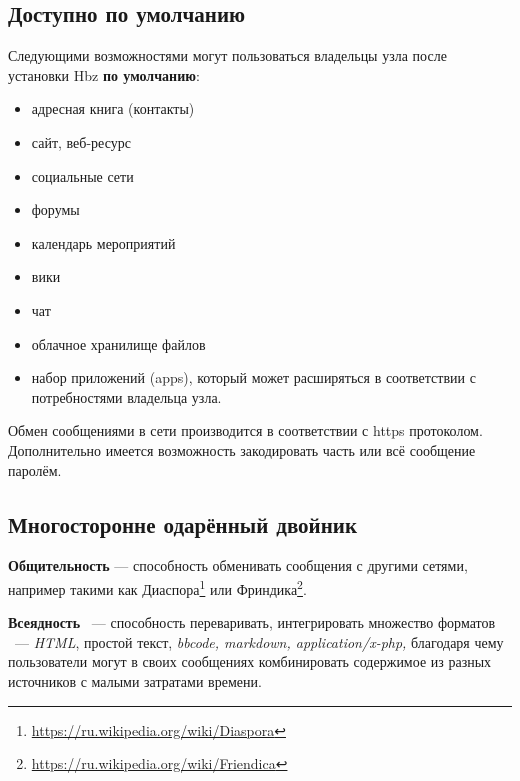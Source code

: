 \documentclass[10pt, a5paper]{article}
\begin{document}
\subsection*{Доступно по умолчанию}

Следующими возможностями могут пользоваться владельцы узла после установки Hbz \textbf{по умолчанию}:

\begin{itemize}
  \item адресная книга (контакты)
  \item сайт, веб-ресурс
  \item социальные сети
  \item форумы
  \item календарь мероприятий
  \item вики
  \item чат
  \item облачное хранилище файлов
  \item набор приложений (apps), который может расширяться в соответствии с потребностями владельца узла.
\end{itemize}

Обмен сообщениями в сети производится в соответствии с https протоколом. Дополнительно имеется возможность закодировать часть или всё сообщение паролём.

\subsection*{Многосторонне одарённый двойник}

\textbf{Общительность} — способность обменивать сообщения с другими сетями, например такими как Диаспора\footnote{\url{https://ru.wikipedia.org/wiki/Diaspora}} или Фриндика\footnote{\url{https://ru.wikipedia.org/wiki/Friendica}}.

\textbf{Всеядность} ~--- способность переваривать, интегрировать множество форматов ~--- \emph{HTML}, простой текст, \emph{bbcode, markdown, application/x-php,} благодаря чему пользователи могут в своих сообщениях комбинировать содержимое из разных источников с малыми затратами времени.
\end{document}
